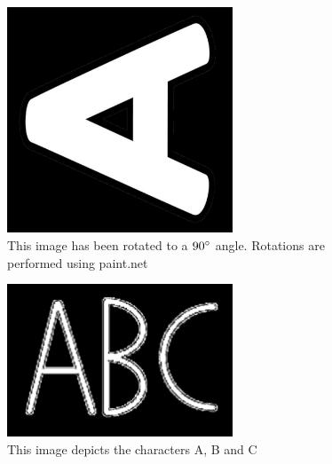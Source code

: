 \documentclass[12pt, titlepage]{article}
\begin{document}
\begin{figure}[h!]
  \begin{center}
    \includegraphics[width=0.6\textwidth]{angle90p}
  \caption{This image has been rotated to a $90\degree$ angle. Rotations are performed using paint.net}
  \label{Fig_angleA} 
  \end{center}
  \end{figure}

\begin{figure}[h!]
  \begin{center}
    \includegraphics[width=0.6\textwidth]{ABC}
  \caption{This image depicts the characters A, B and C}
  \label{Fig_ABC} 
  \end{center}
  \end{figure}
\end{document}
